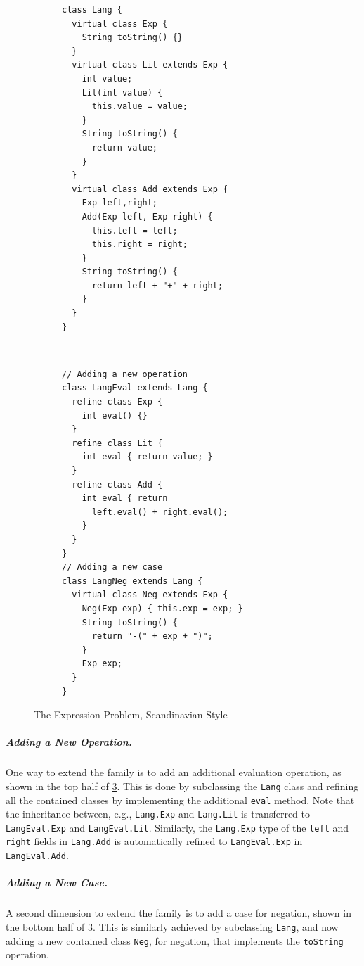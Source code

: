 \begin{figure}[t]
    \centering
    \begin{subfigure}[b]{0.45\textwidth}
\begin{lstlisting}[language=gbeta]
class Lang {
  virtual class Exp {
    String toString() {}
  }
  virtual class Lit extends Exp {
    int value;
    Lit(int value) {
      this.value = value;
    }
    String toString() {
      return value;
    }
  }
  virtual class Add extends Exp {
    Exp left,right;
    Add(Exp left, Exp right) {
      this.left = left;
      this.right = right;
    }
    String toString() {
      return left + "+" + right;
    }
  }
}
\end{lstlisting}
 \label{fig:lang}
    \end{subfigure} ~
    \begin{subfigure}[b]{0.5\textwidth}
\begin{lstlisting}[language=gbeta,  xleftmargin=1mm]
// Adding a new operation
class LangEval extends Lang {
  refine class Exp {
    int eval() {}
  }
  refine class Lit {
    int eval { return value; }
  }
  refine class Add {
    int eval { return
      left.eval() + right.eval();
    }
  }
}
// Adding a new case
class LangNeg extends Lang {
  virtual class Neg extends Exp {
    Neg(Exp exp) { this.exp = exp; }
    String toString() {
      return "-(" + exp + ")";
    }
    Exp exp;
  }
}
\end{lstlisting}
 \label{fig:extend}
    \end{subfigure}
    \caption{The Expression Problem, Scandinavian Style}
\end{figure}

\subparagraph{Adding a New Operation.}
One way to extend the family is to add an additional evaluation operation, as
shown in the top half of \cref{fig:extend}. This is done by subclassing the
\lstinline{Lang} class and refining all the contained classes by implementing
the additional \lstinline{eval} method. Note that the inheritance between, e.g.,
\lstinline{Lang.Exp} and \lstinline{Lang.Lit} is transferred to
\lstinline{LangEval.Exp} and \lstinline{LangEval.Lit}. Similarly, the
\lstinline{Lang.Exp} type of the \lstinline{left} and \lstinline{right} fields
in \lstinline{Lang.Add} is automatically refined to \lstinline{LangEval.Exp} in
\lstinline{LangEval.Add}.

\subparagraph{Adding a New Case.}
A second dimension to extend the family is to add a case for negation, shown in
the bottom half of \cref{fig:extend}. This is similarly achieved by subclassing
\lstinline{Lang}, and now adding a new contained class \lstinline{Neg}, for
negation, that implements the \lstinline{toString} operation.

